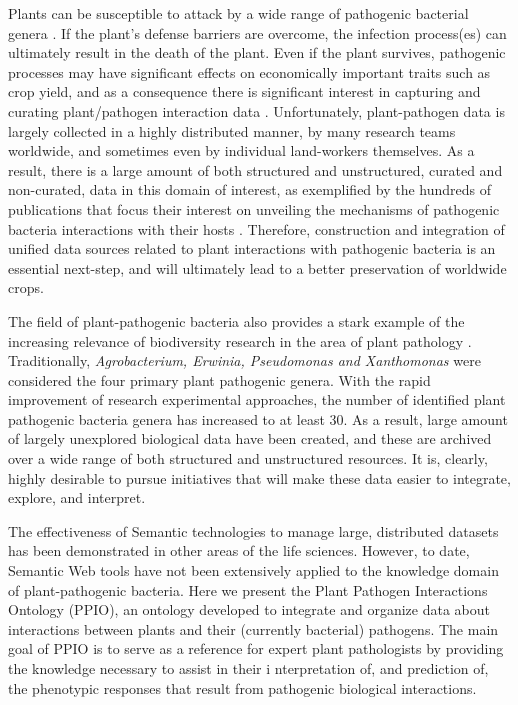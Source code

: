 \documentclass[sw]{iosart2c}
\begin{document}
Plants can be susceptible to attack by a wide range of pathogenic bacterial genera \cite{Mansfield}. If the plant's defense barriers are overcome, the infection process(es) can ultimately result in the death of the plant. Even if the plant survives, pathogenic processes may have significant effects on economically important traits such as crop yield, and as a consequence there is significant interest in capturing and curating plant/pathogen interaction data \cite{Montesinos}. Unfortunately, plant-pathogen data is largely collected in a highly distributed manner, by many research teams worldwide, and sometimes even by individual land-workers themselves.  As a result, there is a large amount of both structured and unstructured, curated and non-curated, data in this domain of interest, as exemplified by the hundreds of publications that focus their interest on unveiling the mechanisms of pathogenic bacteria interactions with their hosts \cite{DeWit} \cite {Dodds}. Therefore, construction and integration of unified data sources related to plant interactions with pathogenic bacteria is an essential next-step, and will ultimately lead to a better preservation of worldwide crops.

The field of plant-pathogenic bacteria also provides a stark example of the increasing relevance of biodiversity research in the area of plant pathology \cite{Bull2010}. Traditionally, {\itshape Agrobacterium, Erwinia, Pseudomonas and Xanthomonas} were considered the four primary plant pathogenic genera. With the rapid improvement of research experimental approaches, the number of identified plant pathogenic bacteria genera has increased to at least 30. As a result, large amount of largely unexplored biological data have been created, and these are archived over a wide range of both structured and unstructured resources. It is, clearly, highly desirable to pursue initiatives that will make these data easier to integrate, explore, and interpret.

The effectiveness of Semantic technologies to manage large, distributed datasets has been demonstrated in other areas of the life sciences. However, to date, Semantic Web tools have not been extensively applied to the knowledge domain of plant-pathogenic bacteria. Here we present the Plant Pathogen Interactions Ontology (PPIO), an ontology developed to integrate and organize data about interactions between plants and their (currently bacterial) pathogens. The main goal of PPIO is to serve as a reference for expert plant pathologists by providing the knowledge necessary to assist in their i nterpretation of, and prediction of, the phenotypic responses that result from pathogenic biological interactions.
\end{document}
